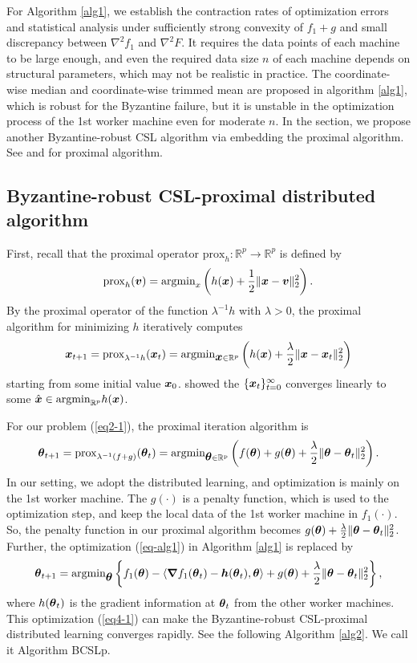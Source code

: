 \documentclass[12pt,a4paper]{article}%
\newcommand{\be}{\begin{equation}}
\newcommand{\ee}{\end{equation}}
\newcommand \vc[1]{{\mbox{\boldmath${#1}$}}}
\newcommand \vtheta{\vc \theta}
\numberwithin{equation}{section}
\newcommand{\sbr}[1]{\left(#1\right)}        %
\begin{document}
For Algorithm \ref{alg1}, we establish the contraction rates of optimization errors and statistical analysis under sufficiently strong convexity of $f_1+g$ and small discrepancy between $\nabla^2f_1$ and $\nabla^2 F$. It requires the data points of each machine to be large enough, and even the required data size $n$ of each machine depends on structural parameters, which may not be realistic in practice. The coordinate-wise median and coordinate-wise trimmed mean are proposed in algorithm \ref{alg1}, which is robust for the Byzantine failure, but it is unstable in the optimization process of the 1st worker machine even for moderate $n$. In the section, we propose another Byzantine-robust CSL algorithm via embedding the proximal algorithm. See \cite{Rockafellar1976} and \cite{ParikhBoyd2014} for proximal algorithm.

\subsection{Byzantine-robust CSL-proximal distributed algorithm}

First, recall that the proximal operator $\mathrm{prox}_h: \mathbb{R}^p\rightarrow\mathbb{R}^p$ is defined by
$$\mathrm{prox}_h(\vc v)=\mathrm{argmin}_x\sbr{h(\vc x)+\frac{1}{2}\|\vc x-\vc v\|_2^2}.$$
By the proximal operator of the function $\lambda^{-1}h$ with $\lambda>0$, the proximal algorithm for minimizing $h$ iteratively computes
$$\vc x_{t+1}=\mathrm{prox}_{\lambda^{-1}h}(\vc x_t)=\mathrm{argmin}_{\vc x\in \mathbb{R}^p}\sbr{h(\vc x)+\frac{\lambda}{2}\|\vc x-\vc x_t\|_2^2}$$
starting from some initial value $\vc x_0$. \cite{Rockafellar1976} showed the $\{\vc x_t\}_{t=0}^\infty$ converges linearly to some $\hat{\vc x}\in \mathrm{argmin}_{\mathbb{R}^p}h(\vc x)$.

For our problem (\ref{eq2-1}), the proximal iteration algorithm is
$$\vtheta_{t+1}=\mathrm{prox}_{\lambda^{-1}(f+g)}(\vtheta_t)=\mathrm{argmin_{\vtheta\in \mathbb{R}^p}}\sbr{f(\vtheta)+g(\vtheta)+\frac{\lambda}{2}\|\vtheta-\vtheta_t\|_2^2}.$$
In our setting, we adopt the distributed learning, and optimization is mainly on the 1st worker machine. The $g(\cdot)$ is a penalty function, which is used to the optimization step, and keep the local data of the 1st worker machine in $f_1(\cdot)$. So, the penalty function in our proximal algorithm becomes $g(\vtheta)+\frac{\lambda}{2}\|\vtheta-\vtheta_t\|_2^2$. Further, the optimization (\ref{eq-alg1}) in Algorithm \ref{alg1} is replaced by
\be\label{eq4-1}
\vtheta_{t+1}=\mathrm{argmin}_\vtheta\left\{f_1(\vtheta)-\langle\vc \nabla f_1(\vtheta_t)-\vc h(\vtheta_t),\vtheta\rangle+g(\vtheta)+\frac{\lambda}{2}\|\vtheta-\vtheta_t\|_2^2\right\},
\ee
where $h(\vtheta_t)$ is the gradient information at $\vtheta_t$ from the other worker machines. This optimization (\ref{eq4-1}) can make the Byzantine-robust CSL-proximal distributed learning converges rapidly. See the following Algorithm \ref{alg2}. We call it Algorithm BCSLp.
\end{document}

